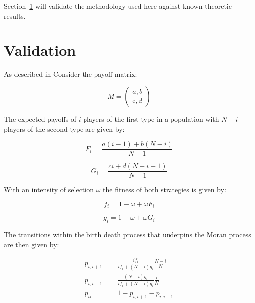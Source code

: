 \documentclass{article}
\begin{document}
Section~\ref{sec:validation} will validate the methodology used here against
known theoretic results.

\section{Validation}\label{sec:validation}

As described in \cite{Nowak} Consider the payoff matrix:

\begin{equation}\label{equ:payoff_matrix}
    M = \begin{pmatrix}
        a, b\\
        c, d
        \end{pmatrix}
\end{equation}

The expected payoffs of \(i\) players of the first type in a population with \(N
- i\) players of the second type are given by:

\begin{equation}\label{equ:expected_payoff_one}
    F_i = \frac{a(i - 1) + b(N - i)}{N - 1}
\end{equation}

\begin{equation}\label{equ:expected_payoff_two}
    G_i = \frac{ci + d(N - i - 1)}{N - 1}
\end{equation}

With an intensity of selection \(\omega\) the fitness of both strategies is
given by:

\begin{equation}\label{equ:expected_payoff_one}
    f_i = 1 - \omega + \omega F_i
\end{equation}

\begin{equation}\label{equ:expected_payoff_two}
    g_i = 1 - \omega + \omega G_i
\end{equation}

The transitions within the birth death process that underpins the Moran process
are then given by:

\begin{align}
	p_{i, i+1}&= \frac{if_i}{if_i+(N-i)g_i}\frac{N-i}{N}\label{equ:p_up}\\
	p_{i, i-1}&= \frac{(N-i)g_i}{if_i+(N-i)g_i}\frac{i}{N}\label{equ:p_down}\\
	p_{ii} &= 1 - p_{i, i+1} - p_{i, i-1}\label{equ:p_stay}
\end{align}
\end{document}
